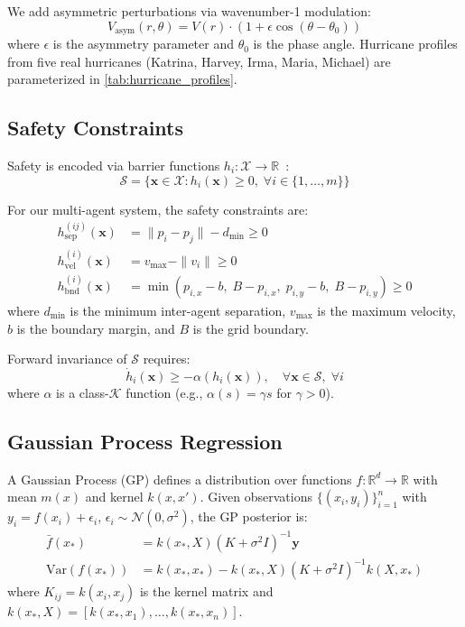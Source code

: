 \documentclass[11pt,twocolumn]{article}
\providecommand{\Cref}[1]{\ref{#1}}
\theoremstyle{definition}
\newcommand{\R}{\mathbb{R}}
\newcommand{\N}{\mathcal{N}}
\newcommand{\cS}{\mathcal{S}}
\newcommand{\cX}{\mathcal{X}}
\newcommand{\cK}{\mathcal{K}}
\newcommand{\vect}[1]{\mathbf{#1}}
\begin{document}
We add asymmetric perturbations via wavenumber-1 modulation:
\begin{equation}
V_{\text{asym}}(r, \theta) = V(r) \cdot (1 + \epsilon \cos(\theta - \theta_0))
\end{equation}
where $\epsilon$ is the asymmetry parameter and $\theta_0$ is the phase angle. Hurricane profiles from five real hurricanes (Katrina, Harvey, Irma, Maria, Michael) are parameterized in \Cref{tab:hurricane_profiles}.

\subsection{Safety Constraints}
\label{sec:safety_constraints}

Safety is encoded via barrier functions $h_i: \cX \to \R$~\citep{Ames2014}:
\begin{equation}
\label{eq:safe_set}
\cS = \{\vect{x} \in \cX : h_i(\vect{x}) \geq 0, \; \forall i \in \{1, \ldots, m\}\}
\end{equation}

For our multi-agent system, the safety constraints are:
\begin{align}
h_{\text{sep}}^{(ij)}(\vect{x}) &= \|p_i - p_j\| - d_{\min} \geq 0 \label{eq:sep} \\
h_{\text{vel}}^{(i)}(\vect{x}) &= v_{\max} - \|v_i\| \geq 0 \label{eq:vel} \\
h_{\text{bnd}}^{(i)}(\vect{x}) &= \min(p_{i,x} - b, \; B - p_{i,x}, \; p_{i,y} - b, \; B - p_{i,y}) \geq 0 \label{eq:bnd}
\end{align}
where $d_{\min}$ is the minimum inter-agent separation, $v_{\max}$ is the maximum velocity, $b$ is the boundary margin, and $B$ is the grid boundary.

Forward invariance of $\cS$ requires:
\begin{equation}
\label{eq:cbf_condition}
\dot{h}_i(\vect{x}) \geq -\alpha(h_i(\vect{x})), \quad \forall \vect{x} \in \cS, \; \forall i
\end{equation}
where $\alpha$ is a class-$\cK$ function (e.g., $\alpha(s) = \gamma s$ for $\gamma > 0$).

\subsection{Gaussian Process Regression}
\label{sec:gp_prelim}

A Gaussian Process (GP) defines a distribution over functions $f: \R^d \to \R$ with mean $m(x)$ and kernel $k(x, x')$. Given observations $\{(x_i, y_i)\}_{i=1}^n$ with $y_i = f(x_i) + \epsilon_i$, $\epsilon_i \sim \N(0, \sigma^2)$, the GP posterior is:
\begin{align}
\bar{f}(x_*) &= k(x_*, X)(K + \sigma^2 I)^{-1} \vect{y} \label{eq:gp_mean} \\
\text{Var}(f(x_*)) &= k(x_*, x_*) - k(x_*, X)(K + \sigma^2 I)^{-1}k(X, x_*) \label{eq:gp_var}
\end{align}
where $K_{ij} = k(x_i, x_j)$ is the kernel matrix and $k(x_*, X) = [k(x_*, x_1), \ldots, k(x_*, x_n)]$.
\end{document}
